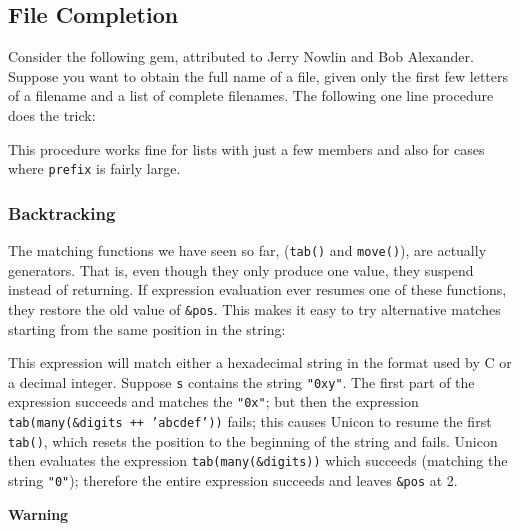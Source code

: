 \subsection*{File Completion}

Consider the following gem, attributed to Jerry Nowlin and Bob Alexander. Suppose you want
to obtain the full name of a file, given only the first few letters of
a filename and a list of complete filenames.
The following one line procedure does the trick:


This procedure works fine for lists with just a few members and also for
cases where \texttt{prefix} is fairly large.

\subsubsection*{Backtracking}

The matching functions we have seen so far,
(\texttt{tab()} and \texttt{move()}), are actually
generators. That is, even though they only produce one
value, they suspend instead of returning. If expression evaluation ever
resumes one of these functions, they restore the old value of
\texttt{\&pos}. This makes it easy to try alternative matches starting
from the same position in the string:


This expression will match either a hexadecimal string in the format
used by C or a decimal integer. Suppose \texttt{s} contains the string
\texttt{"0xy"}. The first part of the
expression succeeds and matches the
\texttt{"0x"}; but then the expression
\texttt{tab(many(\&digits ++
'abcdef'))} fails; this causes Unicon
to resume the first \texttt{tab()}, which resets the position to the
beginning of the string and fails. Unicon then evaluates the expression
\texttt{tab(many(\&digits))} which succeeds (matching the string
\texttt{"0"}); therefore the entire
expression succeeds and leaves \texttt{\&pos} at 2.

{\sffamily\bfseries
Warning}

